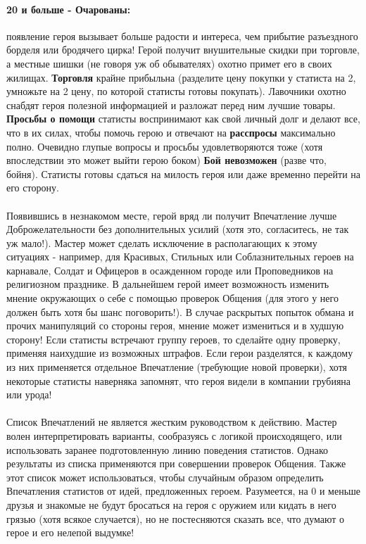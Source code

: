 \paragraph{20 и больше - Очарованы:} появление героя вызывает больше радости и интереса, чем прибытие разъездного борделя или бродячего цирка! Герой получит внушительные скидки при торговле, а местные шишки (не говоря уж об обывателях) охотно примет его в своих жилищах.
\textbf{Торговля} крайне прибыльна (разделите цену покупки у статиста на 2, умножьте на 2 цену, по которой статисты готовы покупать). Лавочники охотно снабдят героя полезной информацией и разложат перед ним лучшие товары.
\textbf{Просьбы о помощи} статисты воспринимают как свой личный долг и делают все, что в их силах, чтобы помочь герою и отвечают на \textbf{расспросы} максимально полно. Очевидно глупые вопросы и просьбы удовлетворяются тоже (хотя впоследствии это может выйти герою боком)
\textbf{Бой невозможен} (разве что, бойня). Статисты готовы сдаться на милость героя или даже временно перейти на его сторону.
\paragraph{}
Появившись в незнакомом месте, герой вряд ли получит Впечатление лучше Доброжелательности без дополнительных усилий (хотя это, согласитесь, не так уж мало!). Мастер может сделать исключение в располагающих к этому ситуациях - например, для Красивых, Стильных или Соблазнительных героев на карнавале, Солдат и Офицеров в осажденном городе или Проповедников на религиозном празднике.
\newline
В дальнейшем герой имеет возможность изменить мнение окружающих о себе с помощью проверок Общения (для этого у него должен быть хотя бы шанс поговорить!). В случае раскрытых попыток обмана и прочих манипуляций со стороны героя, мнение может измениться и в худшую сторону!
\newline
Если статисты встречают группу героев, то сделайте одну проверку, применяя наихудшие из возможных штрафов. Если герои разделятся, к каждому из них применяется отдельное Впечатление (требующие новой проверки), хотя некоторые статисты наверняка запомнят, что героя видели в компании грубияна или урода!
\paragraph{}
Список Впечатлений не является жестким руководством к действию. Мастер волен интерпретировать варианты, сообразуясь с логикой происходящего, или использовать заранее подготовленную линию поведения статистов. Однако результаты из списка применяются при совершении проверок Общения.
\newline
Также этот список может использоваться, чтобы случайным образом определить Впечатления статистов от идей, предложенных героем. Разумеется, на 0 и меньше друзья и знакомые не будут бросаться на героя с оружием или кидать в него грязью (хотя всякое случается), но не постесняются сказать все, что думают о герое и его нелепой выдумке!
